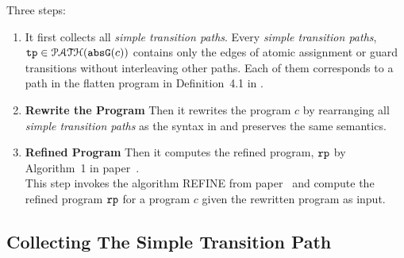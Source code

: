 Three steps:
\begin{enumerate}
  \item It first collects all \emph{simple transition paths}.
  Every \emph{simple transition paths}, $\mathtt{tp} \in \mathcal{PATH}(\mathtt{abs}{\mathtt{G}}(c))$ 
  contains only the edges of atomic assignment or guard transitions without interleaving other paths.
  Each of them corresponds to a path in the flatten program in Definition~4.1 in \cite{GulwaniJK09}.
%
    \item \textbf{Rewrite the Program}
    Then it rewrites the program $c$ by rearranging all \emph{simple transition paths} as the syntax in \cite{GulwaniJK09} and preserves the same semantics.
\item \textbf{Refined Program}
Then it computes the 
refined program, $\mathtt{rp}$ by Algorithm~1 in paper~\cite{GulwaniJK09}.
\\
This step invokes the algorithm REFINE from paper~\cite{GulwaniJK09} and compute the 
refined program $\mathtt{rp}$ for a program $c$ given the rewritten program as input.
\end{enumerate}

\subsection{Collecting The Simple Transition Path}


